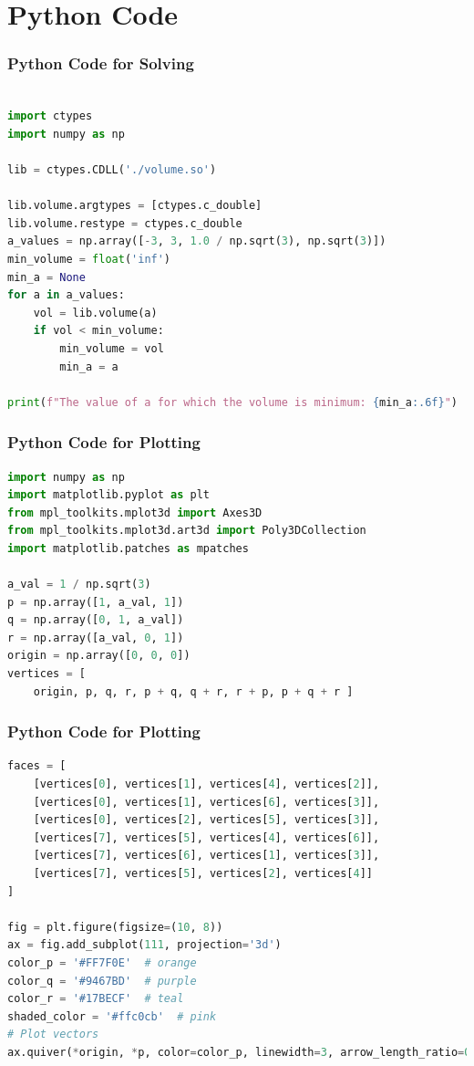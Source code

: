 \documentclass{beamer}
\theoremstyle{remark}
\numberwithin{equation}{section}
\begin{document}
\section{Python Code}
\begin{frame}[fragile]
\frametitle{Python Code for Solving}
\begin{lstlisting}[language=Python]

import ctypes
import numpy as np

lib = ctypes.CDLL('./volume.so')

lib.volume.argtypes = [ctypes.c_double]
lib.volume.restype = ctypes.c_double
a_values = np.array([-3, 3, 1.0 / np.sqrt(3), np.sqrt(3)])
min_volume = float('inf')
min_a = None
for a in a_values:
    vol = lib.volume(a)
    if vol < min_volume:
        min_volume = vol
        min_a = a

print(f"The value of a for which the volume is minimum: {min_a:.6f}")
\end{lstlisting}
\end{frame}
\begin{frame}[fragile]
\frametitle{Python Code for Plotting}
\begin{lstlisting}[language=Python]
import numpy as np
import matplotlib.pyplot as plt
from mpl_toolkits.mplot3d import Axes3D
from mpl_toolkits.mplot3d.art3d import Poly3DCollection
import matplotlib.patches as mpatches

a_val = 1 / np.sqrt(3)
p = np.array([1, a_val, 1])
q = np.array([0, 1, a_val])
r = np.array([a_val, 0, 1])
origin = np.array([0, 0, 0])
vertices = [
    origin, p, q, r, p + q, q + r, r + p, p + q + r ]
\end{lstlisting}
\end{frame}
\begin{frame}[fragile]
\frametitle{Python Code for Plotting}
\begin{lstlisting}[language=Python]
faces = [
    [vertices[0], vertices[1], vertices[4], vertices[2]],
    [vertices[0], vertices[1], vertices[6], vertices[3]],
    [vertices[0], vertices[2], vertices[5], vertices[3]],
    [vertices[7], vertices[5], vertices[4], vertices[6]],
    [vertices[7], vertices[6], vertices[1], vertices[3]],
    [vertices[7], vertices[5], vertices[2], vertices[4]]
]

fig = plt.figure(figsize=(10, 8))
ax = fig.add_subplot(111, projection='3d')
color_p = '#FF7F0E'  # orange
color_q = '#9467BD'  # purple
color_r = '#17BECF'  # teal
shaded_color = '#ffc0cb'  # pink
# Plot vectors
ax.quiver(*origin, *p, color=color_p, linewidth=3, arrow_length_ratio=0.15)

\end{lstlisting}
\end{frame}
\end{document}
